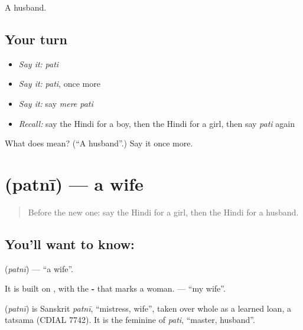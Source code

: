 \begin{grammarlens}[title={What you've built}]
A husband.
\end{grammarlens}

\subsection*{Your turn}
\begin{itemize}
\raggedright
  \item \emph{Say it:} \emph{pati}
  \item \emph{Say it:} \emph{pati}, once more
  \item \emph{Say it:} say \emph{mere pati}
  \item \emph{Recall:} say the Hindi for a boy, then the Hindi for a girl, then say \emph{pati} again
\end{itemize}

\begin{tcolorbox}[breakable,colback=teal!4,colframe=teal!35!black,title={Before you move on}]
What does  mean? (\textquotedblleft{}A husband\textquotedblright{}.) Say it once more.
\end{tcolorbox}
\section[\texorpdfstring{\hi{पत्नी} (patnī)}{पत्नी (patnī)}]{ (patnī) — a wife}

\label{lesson:HI-C118-patni}



\begin{quote}
Before the new one: say the Hindi for a girl, then the Hindi for a husband.
\end{quote}

\subsection*{You'll want to know: }
\textbf{} (\emph{patnī}) — \textquotedblleft{}a wife\textquotedblright{}.

It is built on \textbf{}, with the \textbf{-} that marks a woman. \textbf{ } — \textquotedblleft{}my wife\textquotedblright{}.

\begin{cousinweb}
\textbf{} (\emph{patnī}) is Sanskrit \emph{patnī}, \textquotedblleft{}mistress, wife\textquotedblright{}, taken over whole as a learned loan, a tatsama (CDIAL 7742). It is the feminine of \emph{pati}, \textquotedblleft{}master, husband\textquotedblright{}.
\end{cousinweb}

